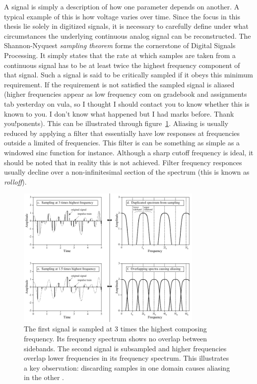 \documentclass[a4paper,10pt]{report}
\begin{document}
A signal is simply a description of how one parameter depends on another. A typical example of this is how voltage varies over time. Since the focus in this thesis lie solely in digitized signals, it is necessary to carefully
define under what circumstances the underlying continuous analog signal can be reconstructed. The Shannon-Nyquest \textit{sampling theorem} forms the cornerstone of Digital Signals Processing. It simply states that the rate at
which samples are taken from a continuous signal has to be at least twice the highest frequency component of that signal. Such a signal is said to be critically sampled if it obeys this minimum requirement. If the requirement is
not satisfied the sampled signal is aliased (higher frequencies appear as low frequency com on gradebook and assignments tab yesterday on vula, so I thought I should contact you to know whether this is known to you. I don't know what happened but I had marks before. Thank you!ponents). This can be illustrated through figure~\ref{fig_invalid_sampling}. Aliasing is usually reduced by applying a filter that essentially
have low responses at frequencies outside a limited  of frequencies. This filter is can be something as simple as a windowed sinc function for instance. Although a sharp cutoff frequency is ideal, it should be noted 
that in reality this is not achieved. Filter frequency responces usually decline over a non-infinitesimal section of the spectrum (this is known as \textit{rolloff}).

\begin{figure}[ht]
 \begin{mdframed}
 \centering
 \includegraphics[width=0.8\textwidth]{images/improper_sampling.png}
 \caption[Aliasing]{The first signal is sampled at 3 times the highest composing frequency. Its frequency spectrum shows no overlap between sidebands. The second signal is subsampled and higher frequencies overlap lower frequencies
 in its frequency spectrum. This illustrates a key observation: discarding samples in one domain causes aliasing in the other \cite{smith1997scientist}.}
 \label{fig_invalid_sampling}
 \end{mdframed}
\end{figure}
\end{document}
